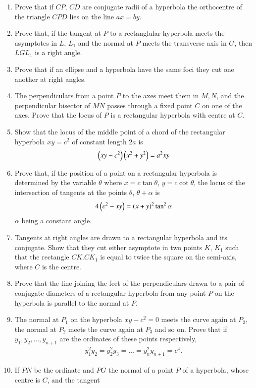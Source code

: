 \begin{enumerate}[label=\arabic*.,ref=\thesubsection.\theenumi]
\item Prove that if $CP$, $CD$ are conjugate radii of a hyperbola the orthocentre of
the triangle $CPD$ lies on the line $ax=by$.
\item Prove that, if the tangent at $P$ to a rectanglular hyperbola meets the asymptotes in $L$, $L_1$ and
the normal at $P$ meets the transverse axis in $G$, then $LGL_1$ is a right angle.
\item Prove that if an ellipse and a hyperbola have the same foci they cut one another at right
angles.
\item The perpendiculars from a point $P$ to the axes meet them in $M, N$, and the perpendicular bisector
of $MN$ passes through a fixed point $C$ on one of the axes.  Prove that the locus of $P$ is a rectangular
hyperbola with centre at $C$.
\item Show that the locus of the middle point of a chord of the rectangular 
hyperbola $xy=c^2$ of constant length $2a$ is
\begin{align*}
\left(xy-c^2\right)\left(x^2+y^2\right) = a^2xy
\end{align*}
\item Prove that, if the position of a point on  a rectangular hyperbola is determined by the
variable $\theta$ where $x = c \tan\theta$, $y = c\cot\theta$, the locus of the intersection of tangents at the 
points $\theta$, $\theta+\alpha$ is
\begin{align*}
4\left(c^2-xy\right) = \left(x+y\right)^2\tan^2\alpha
\end{align*}
$\alpha$ being a constant angle.
\item Tangents at right angles are drawn to a rectangular hyperbola and its
conjugate.  Show that they cut either asymptote in two points
$K$, $K_1$ such that the rectangle $CK.CK_1$ is equal to twice the square on
the semi-axis, where $C$ is the centre.
\item Prove that the line joining the feet of the perpendiculars drawn to a
pair of conjugate diameters of a rectangular hyperbola from any point $P$ on the
hyperbola is parallel to the normal at $P$.
\item  The normal at $P_1$ on the hyperbola $xy-c^2=0$ meets the curve again at $P_2$, the normal at $P_2$
 meets the curve again at $P_3$
and so on.  Prove that if $y_1,y_2,\dots, y_{n+1}$ are the ordinates of these points respectively,
\begin{align*}
y_1^2y_2 = y_2^2y_3 = \dots = y_n^2y_{n+1} = c^4.
\end{align*}
\item If $PN$ be the ordinate and $PG$ the normal of a point $P$ of a hyperbola, whose centre is $C$, and the tangent

\end{enumerate}
